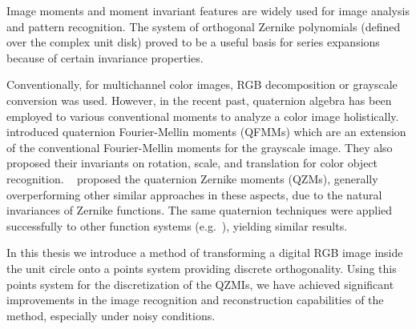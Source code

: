 Image moments and moment invariant features are widely used for image analysis and pattern recognition. The system of orthogonal Zernike polynomials (defined over the complex unit disk) proved to be a useful basis for series expansions because of certain invariance properties.

Conventionally, for multichannel color images, RGB decomposition or grayscale conversion was used. However, in the recent past, quaternion algebra has been employed to various conventional moments to analyze a color image holistically. \citeauthor{qfmm}~\cite{qfmm} introduced quaternion Fourier-Mellin moments (QFMMs) which are an extension of the conventional Fourier-Mellin moments for the grayscale image. They also proposed their invariants on rotation, scale, and translation for color object recognition. \citeauthor{qzmi}~\cite{qzmi} proposed the quaternion Zernike moments (QZMs), generally overperforming other similar approaches in these aspects, due to the natural invariances of Zernike functions. The same quaternion techniques were applied successfully to other function systems (e.g.~\cite{bessel-fourier, chebyshev-fourier}), yielding similar results.

In this thesis we introduce a method of transforming a digital RGB image inside the unit circle onto a points system providing discrete orthogonality. Using this points system for the discretization of the QZMIs, we have achieved significant improvements in the image recognition and reconstruction capabilities of the method, especially under noisy conditions.